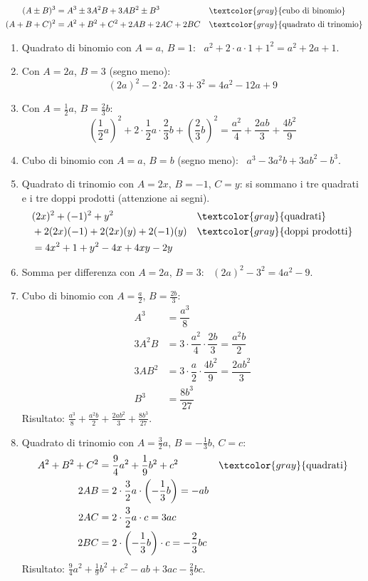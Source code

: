 \begin{question}[ID=2.1, subtitle={Prodotti notevoli — serie 1}, tags={prodotti notevoli, polinomi}, difficulty=facile]
\begin{explanation}
\[\begin{aligned}
(A\pm B)^3 &= A^3\pm3A^2B+3AB^2\pm B^3 && \textcolor{gray}{\text{cubo di binomio}}\\
(A+B+C)^2 &= A^2+B^2+C^2+2AB+2AC+2BC && \textcolor{gray}{\text{quadrato di trinomio}}
\end{aligned}\]
\begin{enumerate}
    \item Quadrato di binomio con $A=a$, $B=1$: \ $a^2+2\cdot a\cdot1+1^2=a^2+2a+1$.
    \item Con $A=2a$, $B=3$ (segno meno):
    \[ (2a)^2-2\cdot2a\cdot3+3^2=4a^2-12a+9 \]
    \item Con $A=\tfrac12a$, $B=\tfrac23b$:
    \[ \left(\dfrac12a\right)^2+2\cdot\dfrac12a\cdot\dfrac23b+\left(\dfrac23b\right)^2=\dfrac{a^2}{4}+\dfrac{2ab}{3}+\dfrac{4b^2}{9} \]
    \item Cubo di binomio con $A=a$, $B=b$ (segno meno): \ $a^3-3a^2b+3ab^2-b^3$.
    \item Quadrato di trinomio con $A=2x$, $B=-1$, $C=y$: si sommano i tre quadrati e i tre doppi prodotti (attenzione ai segni).
    \[\begin{aligned}
    &(2x)^2+(-1)^2+y^2 && \textcolor{gray}{\text{quadrati}}\\
    &+2(2x)(-1)+2(2x)(y)+2(-1)(y) && \textcolor{gray}{\text{doppi prodotti}}\\
    &= 4x^2+1+y^2-4x+4xy-2y
    \end{aligned}\]
    \item Somma per differenza con $A=2a$, $B=3$: \ $(2a)^2-3^2=4a^2-9$.
    \item Cubo di binomio con $A=\tfrac a2$, $B=\tfrac{2b}{3}$:
    \[\begin{aligned}
    A^3 &= \dfrac{a^3}{8}\\
    3A^2B &= 3\cdot\dfrac{a^2}{4}\cdot\dfrac{2b}{3}=\dfrac{a^2b}{2}\\
    3AB^2 &= 3\cdot\dfrac a2\cdot\dfrac{4b^2}{9}=\dfrac{2ab^2}{3}\\
    B^3 &= \dfrac{8b^3}{27}
    \end{aligned}\]
    Risultato: $\tfrac{a^3}{8}+\tfrac{a^2b}{2}+\tfrac{2ab^2}{3}+\tfrac{8b^3}{27}$.
    \item Quadrato di trinomio con $A=\tfrac32a$, $B=-\tfrac13b$, $C=c$:
    \[\begin{aligned}
    A^2+B^2+C^2 &= \dfrac94a^2+\dfrac19b^2+c^2 && \textcolor{gray}{\text{quadrati}}\\
    2AB &= 2\cdot\dfrac32a\cdot\left(-\dfrac13b\right)=-ab\\
    2AC &= 2\cdot\dfrac32a\cdot c=3ac\\
    2BC &= 2\cdot\left(-\dfrac13b\right)\cdot c=-\dfrac23bc
    \end{aligned}\]
    Risultato: $\tfrac94a^2+\tfrac19b^2+c^2-ab+3ac-\tfrac23bc$.
\end{enumerate}
\end{explanation}
\end{question}

